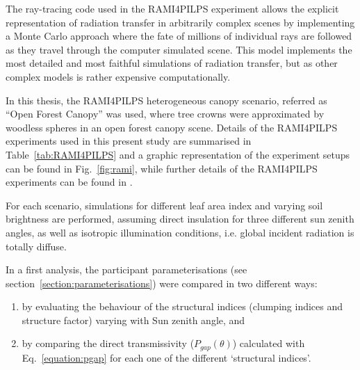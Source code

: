 The ray-tracing code used in the RAMI4PILPS experiment allows the explicit representation of radiation transfer in arbitrarily complex scenes \citep{Govaerts1998} by implementing a Monte Carlo approach where the fate of millions of individual rays are followed as they travel through the computer simulated scene. This model implements the most detailed and most faithful simulations of radiation transfer, but as other complex models is rather expensive computationally. 

In this thesis, the RAMI4PILPS heterogeneous canopy scenario, referred as ``Open Forest Canopy'' was used, where tree crowns were approximated by woodless spheres in an open forest canopy scene. Details of the RAMI4PILPS experiments used in this present study are summarised in Table~\ref{tab:RAMI4PILPS} and a graphic representation of the experiment setups can be found in Fig.~\ref{fig:rami}, while further details of the RAMI4PILPS experiments can be found in \citet{Widlowski2011}. 

For each scenario, simulations for different leaf area index and varying soil brightness are performed, assuming direct insulation for three different sun zenith angles, as well as isotropic illumination conditions, i.e. global incident radiation is totally diffuse.

In a first analysis, the participant parameterisations (see section~\ref{section:parameterisations}) were compared in two different ways:
\begin{enumerate}[i]
\item by evaluating the behaviour of the structural indices (clumping indices and structure factor) varying with Sun zenith angle, and
\item by comparing the direct transmissivity ($P_{gap}(\theta)$) calculated with Eq.~\ref{equation:pgap} for each one of the different `structural indices'.
\end{enumerate}

